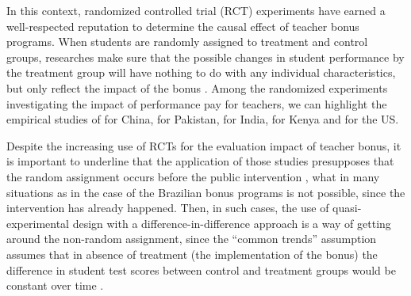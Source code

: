 \documentclass[a4paper, 12pt]{article}
\begin{document}

In this context, randomized controlled trial (RCT) experiments have earned a well-respected reputation to determine the causal effect of teacher bonus programs. When students are randomly assigned to treatment and control groups, researches make sure that the possible changes in student performance by the treatment group will have nothing to do with any individual characteristics, but only reflect the impact of the bonus \citep{gertler2016impact}. Among the randomized experiments investigating the impact of performance pay for teachers, we can highlight the empirical studies of \citet{loyalka2019pay} for China, \citet{barrera2017teacher} for Pakistan, \citet{muralidharan2011teacher} for India, \citet{glewwe2010teacher} for Kenya and \citet{fryer2013teacher, goodman2013design, springer2012team} for the US.











Despite the increasing use of RCTs for the evaluation impact of teacher bonus, it is important to underline that the application of those studies presupposes that the random assignment occurs before the public intervention \citep{petrou2011economic}, what in many situations \textemdash as in the case of the Brazilian bonus programs \textemdash is not possible, since the intervention has already happened. Then, in such cases, the use of quasi-experimental design with a difference-in-difference approach is a way of getting around the non-random assignment, since the ``common trends'' assumption assumes that in absence of treatment (the implementation of the bonus) the difference in student test scores between control and treatment groups would be constant over time \citep{deschenes2018quasi}.
\end{document}
